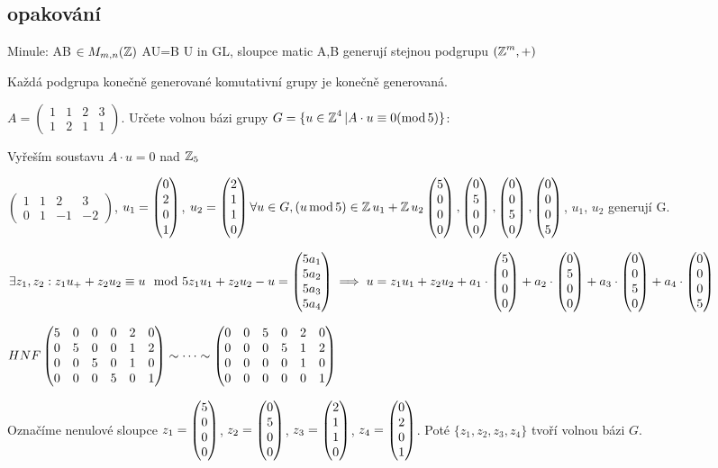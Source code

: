 \subsection*{opakování}
Minule: AB $\in M_{m,n}(\operatorname{\mathbb{Z}})$ AU=B U in GL, sloupce matic A,B generují stejnou podgrupu $(\operatorname{\mathbb{Z}}^m,+)$

\begin{note}
Každá podgrupa konečně generované komutativní grupy je konečně generovaná.
\end{note} 

\begin{example}
$A = 
\begin{pmatrix}
1 & 1 & 2 & 3\\
1 & 2 & 1 & 1
\end{pmatrix}$.
Určete volnou bázi grupy $G=\{u\in\operatorname{\mathbb{Z}}^4|A\cdot u\equiv0(\operatorname{mod} 5)\}$:    

Vyřeším soustavu $A\cdot u=0$ nad $\operatorname{\mathbb{Z}}_5$

$\begin{pmatrix}
1 & 1 & 2 & 3\\
0 & 1 & -1 & -2
\end{pmatrix}$, 
$u_1=\begin{pmatrix} 0 \\ 2 \\ 0 \\ 1 \end{pmatrix}$, $u_2=\begin{pmatrix} 2 \\ 1 \\ 1 \\ 0 \end{pmatrix}\\
\forall u\in G, (u \operatorname{mod} 5) \in \operatorname{\mathbb{Z}} u_1 + \operatorname{\mathbb{Z}} u_2\\
\begin{pmatrix} 5 \\ 0 \\ 0 \\ 0 \end{pmatrix},\begin{pmatrix} 0 \\ 5 \\ 0 \\ 0 \end{pmatrix},\begin{pmatrix} 0 \\ 0 \\ 5 \\ 0 \end{pmatrix},\begin{pmatrix} 0 \\ 0 \\ 0 \\ 5 \end{pmatrix}$, $u_1$, $u_2$ generují G.

$\exists z_1, z_2: z_1u_+ + z_2 u_2\equiv u \mod 5\\
z_1 u_1 + z_2 u_2-u=\begin{pmatrix} 5a_1 \\ 5a_2 \\ 5a_3 \\ 5a_4 \end{pmatrix}\implies u=z_1u_1+z_2u_2+a_1\cdot \begin{pmatrix} 5 \\ 0 \\ 0 \\ 0 \end{pmatrix} + a_2\cdot \begin{pmatrix} 0 \\ 5 \\ 0 \\ 0 \end{pmatrix} + a_3\cdot \begin{pmatrix} 0 \\ 0 \\ 5 \\ 0 \end{pmatrix}+ a_4\cdot \begin{pmatrix} 0 \\ 0 \\ 0 \\ 5 \end{pmatrix}
$


$
HNF\\
\begin{pmatrix}
5 & 0 & 0 & 0 & 2 & 0\\
0 & 5 & 0 & 0 & 1 & 2\\
0 & 0 & 5 & 0 & 1 & 0\\
0 & 0 & 0 & 5 & 0 & 1
\end{pmatrix}
\sim\cdots\sim
\begin{pmatrix}
0 & 0 & 5 & 0 & 2 & 0\\
0 & 0 & 0 & 5 & 1 & 2\\
0 & 0 & 0 & 0 & 1 & 0\\
0 & 0 & 0 & 0 & 0 & 1
\end{pmatrix}
$

Označíme nenulové sloupce $z_1=\begin{pmatrix} 5 \\ 0 \\ 0 \\ 0 \end{pmatrix}$, $z_2=\begin{pmatrix} 0 \\ 5 \\ 0 \\ 0 \end{pmatrix}$, $z_3=\begin{pmatrix} 2 \\ 1 \\ 1 \\ 0 \end{pmatrix}$, $z_4=\begin{pmatrix} 0 \\ 2 \\ 0 \\ 1 \end{pmatrix}$. Poté $\{z_1,z_2,z_3,z_4\}$ tvoří volnou bázi $G$.
\end{example}

